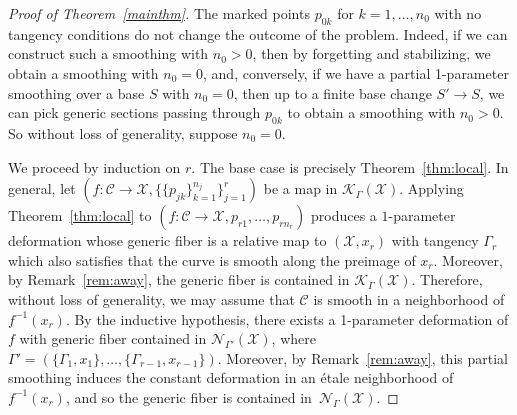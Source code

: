 \documentclass[11pt]{amsart}
\numberwithin{equation}{section}
\theoremstyle{definition}
\theoremstyle{remark}
\newcommand{\calK}{\mathcal K}
\newcommand{\calN}{\mathcal N}
\newcommand{\calX}{\mathcal X}
\newcommand{\calC}{\mathcal C}
\begin{document}
\begin{proof}[Proof of Theorem~\ref{mainthm}]  The marked points $p_{0k}$ for $k = 1, \ldots, n_0$ with no tangency conditions do not change the outcome of the problem. Indeed, if we can construct such a smoothing with $n_0 > 0$, then by forgetting and stabilizing, we obtain a smoothing with $n_0 = 0$, and, conversely, if we have a partial 1-parameter smoothing over a base  $S$ with $n_0  = 0$, then up to a finite base change $S' \to S$, we can pick generic sections passing through $p_{0k}$ to obtain a smoothing with $n_0 > 0$. So without loss of generality, suppose $n_0 = 0$. 

We proceed by induction on $r$. The base case is precisely Theorem~\ref{thm:local}. In general, let $(f \colon  \calC \to \calX, \{\{p_{jk}\}_{k = 1}^{n_j} \}_{j = 1}^r)$ be a map in $\calK_{\Gamma}(\calX)$. Applying Theorem~\ref{thm:local} to $(f \colon  \calC \to \calX, p_{r1}, \ldots, p_{rn_r})$ produces a \mbox{$1$-parameter} deformation whose generic fiber is a relative map to $(\calX, x_r)$ with tangency $\Gamma_r$ which also satisfies that the curve is smooth along the preimage of $x_r$. Moreover, by Remark~\ref{rem:away}, the generic fiber is contained in $\calK_\Gamma(\calX)$. Therefore, without loss of generality, we may assume that $\calC$ is smooth in a neighborhood of $f^{-1}(x_r)$. By the inductive hypothesis, there exists a 1-parameter deformation of $f$ with generic fiber contained in $\calN_{\Gamma'}(\calX)$, where $\Gamma' = (\{\Gamma_1, x_1\}, \ldots, \{\Gamma_{r-1}, x_{r-1}\})$. Moreover, by Remark~\ref{rem:away}, this partial smoothing induces the constant deformation in an \'etale neighborhood of $f^{-1}(x_r)$, and so the generic fiber is contained in~$\calN_{\Gamma}(\calX)$. 
\end{proof} 
\end{document}
